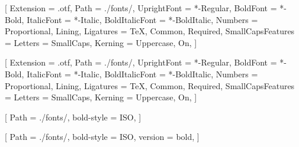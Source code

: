 
\setmainfont{LibertinusSerif}[%
Extension         = .otf,
Path              = ./fonts/,
UprightFont       = *-Regular,
BoldFont          = *-Bold,
ItalicFont        = *-Italic,
BoldItalicFont    = *-BoldItalic,
Numbers           = {Proportional, Lining},
Ligatures         = {TeX, Common, Required},
SmallCapsFeatures = {Letters = SmallCaps},
Kerning           = {Uppercase, On},
]%

\setsansfont{LibertinusSans}[%
Extension         = .otf,
Path              = ./fonts/,
UprightFont       = *-Regular,
BoldFont          = *-Bold,
ItalicFont        = *-Italic,
BoldItalicFont    = *-BoldItalic,
Numbers           = {Proportional, Lining},
Ligatures         = {TeX, Common, Required},
SmallCapsFeatures = {Letters = SmallCaps},
Kerning           = {Uppercase, On},
]%


\setmonofont{Latin Modern Mono}



[%
Path       = ./fonts/,
bold-style = ISO, %
]%

[%
Path       = ./fonts/,
bold-style = ISO, %
version    = bold,
]%


